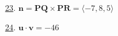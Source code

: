 \documentclass[fleqn]{article}
\renewcommand{\vec}[1]{\mathbf{#1}}
\begin{document}
\begin{itemize}
\item[\hyperlink{23-problem}{23}.]\hypertarget{23-answer}{}$\vec n=\vec{PQ}\times\vec{PR}=\langle -7,8,5\rangle$
\smallskip

\item[\hyperlink{24-problem}{24}.]\hypertarget{24-answer}{}$\vec u\cdot\vec v=-46$
\smallskip
\end{itemize}
\end{document}

